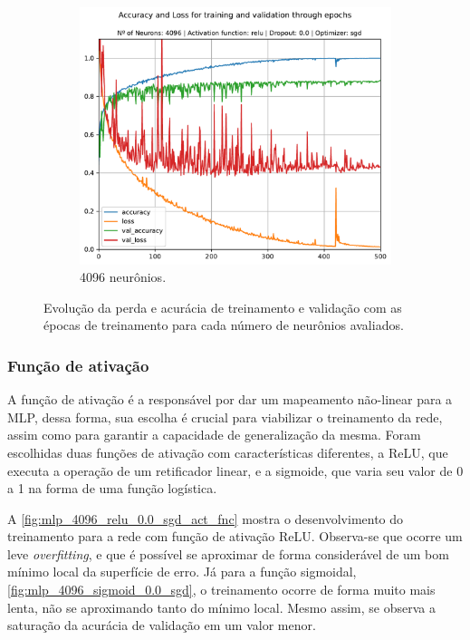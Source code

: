 \begin{figure}[H]
\begin{subfigure}[H]{0.49\textwidth}
	\end{subfigure}
	\begin{subfigure}[H]{0.49\textwidth}
		\centering
		\includegraphics[width = \textwidth]{../../plot/mlp/mlp_4096_relu_0.0_sgd}
		\caption{4096 neurônios.}
		\label{fig:mlp_4096_relu_0.0_sgd}
	\end{subfigure}
	\caption{Evolução da perda e acurácia de treinamento e validação com as épocas de treinamento para cada número de neurônios avaliados.}
	\label{fig:search_neurons_training}
\end{figure}

\subsubsection{Função de ativação}

	A função de ativação é a responsável por dar um mapeamento não-linear para a MLP, dessa forma, sua escolha é crucial para viabilizar o treinamento da rede, assim como para garantir a capacidade de generalização da mesma. Foram escolhidas duas funções de ativação com características diferentes, a ReLU, que executa a operação de um retificador linear, e a sigmoide, que varia seu valor de 0 a 1 na forma de uma função logística. 
	
	A \autoref{fig:mlp_4096_relu_0.0_sgd_act_fnc} mostra o desenvolvimento do treinamento para a rede com função de ativação ReLU. Observa-se que ocorre um leve \textit{overfitting}, e que é possível se aproximar de forma considerável de um bom mínimo local da superfície de erro. Já para a função sigmoidal, \autoref{fig:mlp_4096_sigmoid_0.0_sgd}, o treinamento ocorre de forma muito mais lenta, não se aproximando tanto do mínimo local. Mesmo assim, se observa a saturação da acurácia de validação em um valor menor.
	
